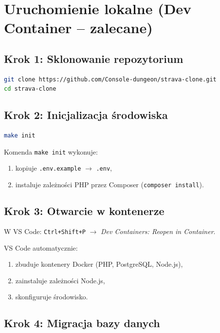 \documentclass[12pt,a4paper]{report}
\begin{document}
\section{Uruchomienie lokalne (Dev Container -- zalecane)}

\subsection{Krok 1: Sklonowanie repozytorium}

\begin{lstlisting}[language=bash, numbers=none]
git clone https://github.com/Console-dungeon/strava-clone.git
cd strava-clone
\end{lstlisting}

\subsection{Krok 2: Inicjalizacja środowiska}

\begin{lstlisting}[language=bash, numbers=none]
make init
\end{lstlisting}

Komenda \texttt{make init} wykonuje:
\begin{enumerate}[noitemsep]
    \item kopiuje \texttt{.env.example} $\to$ \texttt{.env},
    \item instaluje zależności PHP przez Composer (\texttt{composer install}).
\end{enumerate}

\subsection{Krok 3: Otwarcie w kontenerze}

W VS Code: \texttt{Ctrl+Shift+P} $\to$ \textit{Dev Containers: Reopen in Container}.

VS Code automatycznie:
\begin{enumerate}[noitemsep]
    \item zbuduje kontenery Docker (PHP, PostgreSQL, Node.js),
    \item zainstaluje zależności Node.js,
    \item skonfiguruje środowisko.
\end{enumerate}

\subsection{Krok 4: Migracja bazy danych}
\end{document}
